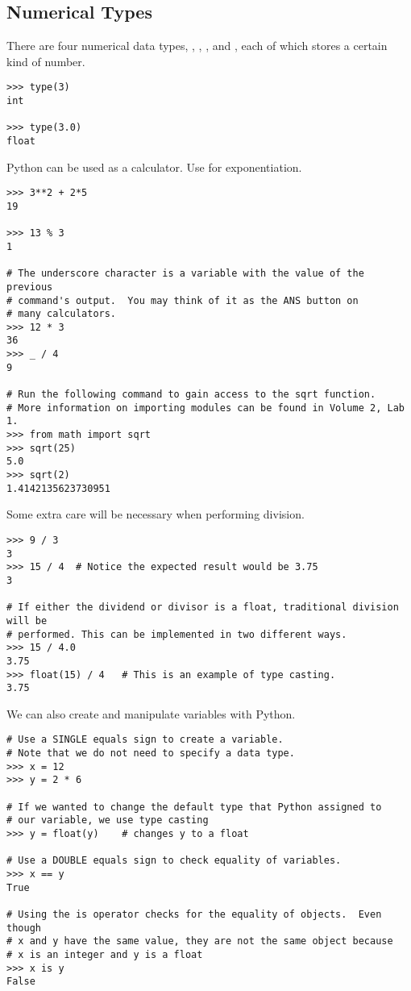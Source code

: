 \subsection*{Numerical Types}
There are four numerical data types, , , 
, and , each of which stores a certain kind of number. 

\begin{lstlisting}
>>> type(3)
int

>>> type(3.0)
float
\end{lstlisting}

Python can be used as a calculator. Use \li{**} for exponentiation.
\begin{lstlisting}
>>> 3**2 + 2*5
19

>>> 13 % 3
1

# The underscore character is a variable with the value of the previous
# command's output.  You may think of it as the ANS button on 
# many calculators.
>>> 12 * 3
36
>>> _ / 4
9

# Run the following command to gain access to the sqrt function.
# More information on importing modules can be found in Volume 2, Lab 1.
>>> from math import sqrt
>>> sqrt(25)
5.0
>>> sqrt(2)
1.4142135623730951
\end{lstlisting}

Some extra care will be necessary when performing division.
\begin{lstlisting}
>>> 9 / 3
3
>>> 15 / 4	# Notice the expected result would be 3.75
3

# If either the dividend or divisor is a float, traditional division will be
# performed. This can be implemented in two different ways. 
>>> 15 / 4.0
3.75
>>> float(15) / 4	# This is an example of type casting.
3.75

\end{lstlisting}

We can also create and manipulate variables with Python.

\begin{lstlisting}
# Use a SINGLE equals sign to create a variable.
# Note that we do not need to specify a data type.
>>> x = 12
>>> y = 2 * 6

# If we wanted to change the default type that Python assigned to
# our variable, we use type casting
>>> y = float(y)	# changes y to a float

# Use a DOUBLE equals sign to check equality of variables.
>>> x == y  
True

# Using the is operator checks for the equality of objects.  Even though
# x and y have the same value, they are not the same object because
# x is an integer and y is a float
>>> x is y
False                   
\end{lstlisting}

